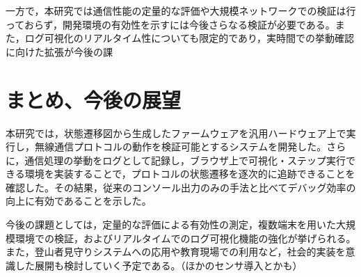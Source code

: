 \documentclass[paper]{ieicej}
\begin{document}
一方で，本研究では通信性能の定量的な評価や大規模ネットワークでの検証は行っておらず，開発環境の有効性を示すには今後さらなる検証が必要である。また，ログ可視化のリアルタイム性についても限定的であり，実時間での挙動確認に向けた拡張が今後の課


\section{まとめ、今後の展望}
本研究では，状態遷移図から生成したファームウェアを汎用ハードウェア上で実行し，無線通信プロトコルの動作を検証可能とするシステムを開発した。さらに，通信処理の挙動をログとして記録し，ブラウザ上で可視化・ステップ実行できる環境を実装することで，プロトコルの状態遷移を逐次的に追跡できることを確認した。その結果，従来のコンソール出力のみの手法と比べてデバッグ効率の向上に有効であることを示した。

今後の課題としては，定量的な評価による有効性の測定，複数端末を用いた大規模環境での検証，およびリアルタイムでのログ可視化機能の強化が挙げられる。また，登山者見守りシステムへの応用や教育現場での利用など，社会的実装を意識した展開も検討していく予定である。（ほかのセンサ導入とかも）


\ack %

%
%
\begin{thebibliography}{99}%
\bibitem{}
\end{thebibliography}

\appendix
\section{}

\begin{biography}
\profile{}{}{}
\end{biography}
\end{document}
